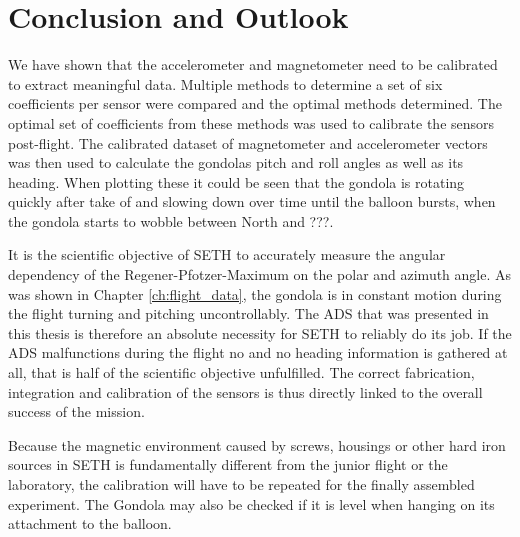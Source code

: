 \chapter{Conclusion and Outlook\label{ch:conclusion_outlook}}
We have shown that the accelerometer and magnetometer need to be calibrated to extract meaningful data. Multiple methods to determine a set of six coefficients per sensor were compared and the optimal methods determined. The optimal set of coefficients from these methods was used to calibrate the sensors post-flight. The calibrated dataset of magnetometer and accelerometer vectors was then used to calculate the gondolas pitch and roll angles as well as its heading. When plotting these it could be seen that the gondola is rotating quickly after take of and slowing down over time until the balloon bursts, when the gondola starts to wobble between North and ???.

It is the scientific objective of \ac{SETH} to accurately measure the angular dependency of the Regener-Pfotzer-Maximum on the polar and azimuth angle. As was shown in Chapter \ref{ch:flight_data}, the gondola is in constant motion during the flight turning and pitching uncontrollably. The \ac{ADS} that was presented in this thesis is therefore an absolute necessity for \ac{SETH} to reliably do its job. If the \ac{ADS} malfunctions during the flight no and no heading information is gathered at all, that is half of the scientific objective unfulfilled. The correct fabrication, integration and calibration of the sensors is thus directly linked to the overall success of the mission.
 

Because the magnetic environment caused by screws, housings or other hard iron sources in \ac{SETH} is fundamentally different from the junior flight or the laboratory, the calibration will have to be repeated for the finally assembled experiment. The Gondola may also be checked if it is level when hanging on its attachment to the balloon.